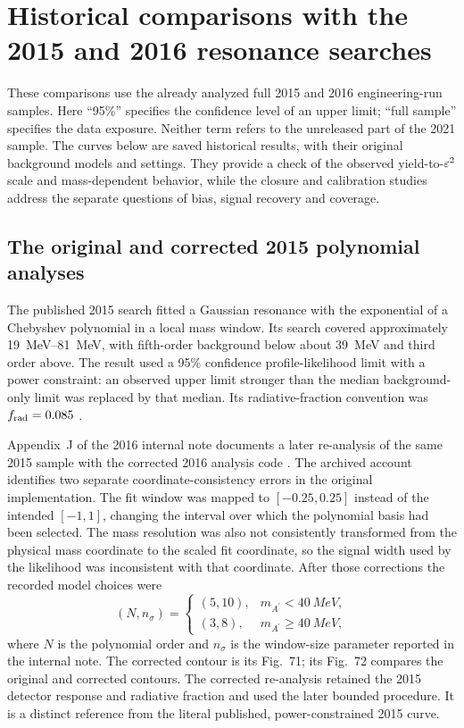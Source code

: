 \section{Historical comparisons with the 2015 and 2016 resonance searches}
\label{app:v501-published-comparisons}

These comparisons use the already analyzed full 2015 and 2016 engineering-run
samples. Here ``95\%'' specifies the confidence level of an upper limit;
``full sample'' specifies the data exposure. Neither term refers to the
unreleased part of the 2021 sample. The curves below are saved historical
results, with their original background models and settings. They provide a
check of the observed yield-to-$\varepsilon^2$ scale and mass-dependent behavior,
while the closure and calibration studies address the separate questions
of bias, signal recovery and coverage.

\subsection{The original and corrected 2015 polynomial analyses}
\label{sec:v501-2015-polynomial-history}

The published 2015 search fitted a Gaussian resonance with the
exponential of a Chebyshev polynomial in a local mass window. Its search covered
approximately \SIrange{19}{81}{MeV}, with fifth-order background below
about \SI{39}{MeV} and third order above. The result used a 95\% confidence
profile-likelihood limit with a power constraint: an observed upper limit
stronger than the median background-only limit was replaced by that
median. Its radiative-fraction convention was $f_{\rm rad}=0.085$
\cite{HPS2015DarkPhoton,HPS2015InternalNote}.

Appendix~J of the 2016 internal note documents a later re-analysis of the
same 2015 sample with the corrected 2016 analysis code
\cite{HPS2016BumpInternal}. The archived account identifies two separate
coordinate-consistency errors in the original implementation. The fit
window was mapped to $[-0.25,0.25]$ instead of the intended $[-1,1]$,
changing the interval over which the polynomial basis had been selected.
The mass resolution was also not consistently transformed from the
physical mass coordinate to the scaled fit coordinate, so the signal
width used by the likelihood was inconsistent with that coordinate.
After those corrections the recorded model choices were
\begin{equation}
 (N,n_\sigma)=
 \begin{cases}
 (5,10),&m_{A^\prime}<\SI{40}{MeV},\\
 (3,8),&m_{A^\prime}\geq\SI{40}{MeV},
 \end{cases}
 \label{eq:v501-corrected-2015-window}
\end{equation}
where $N$ is the polynomial order and $n_\sigma$ is the window-size
parameter reported in the internal note. The corrected contour is its
Fig.~71; its Fig.~72 compares the original and corrected contours.
The corrected re-analysis retained the 2015 detector response and radiative fraction
and used the later bounded \CLs{} procedure. It is a distinct reference
from the literal published, power-constrained 2015 curve.


